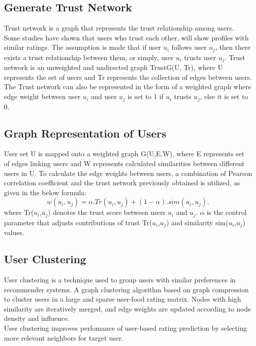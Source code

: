 \subsection{Generate Trust Network}
Trust network is a graph that represents the trust relationship among users. Some studies have shown that users who trust each other, will show profiles with similar ratings\cite*{MORADI2015462}. The assumption is made that if user $u_i$ follows user $u_j$, then there exists a trust relationship between them, or simply, user $u_i$ trusts user $u_j$. Trust network\cite*{9775081, oulu_tdlgc} is an unweighted and undirected graph TrustG(U, Tr), where U represents the set of users and Tr represents the collection of edges between users.
\\
\indent The Trust network can also be represented in the form of a weighted graph where edge weight between user $u_i$ and user $u_j$ is set to 1 if $u_i$ trusts $u_j$, else it is set to 0.

\subsection{Graph Representation of Users}
User set U is mapped onto a weighted graph G(U,E,W)\cite*{9775081, oulu_tdlgc}, where E represents set of edges linking users and W represents calculated similarities between different users in U. To calculate the edge weights between users, a combination of Pearson correlation coefficient and the trust network previously obtained is utilized\cite*{9775081}, as given in the below formula:
\begin{equation*} w(u_{i},u_{j})=\alpha.Tr\left({u_{i},u_{j}}\right)+\left({1-\alpha }\right).sim\left({u_{i},u_{j}}\right). \tag{3}\end{equation*}
where Tr($u_i$,$u_j$) denotes the trust score between users $u_i$ and $u_j$.
$\alpha$ is the control parameter that adjusts contributions of trust Tr($u_i$,$u_j$) and similarity sim($u_i$,$u_j$) values.

\subsection{User Clustering}
User clustering is a technique used to group users with similar preferences in recommender systems. A graph clustering algorithm based on graph compression\cite*{ZHAO2021358} to cluster users in a large and sparse user-food rating matrix. Nodes with high similarity are iteratively merged, and edge weights are updated according to node density and influence.
\\
\indent User clustering improves perfomance of user-based rating prediction by selecting more relevant neighbors for target user.

